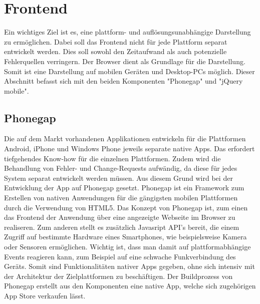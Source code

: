 \documentclass[10pt, conference, compsocconf]{IEEEtran}
\begin{document}
\section{Frontend}
Ein wichtiges Ziel ist es, eine plattform- und aufl\"osungsunabh\"angige Darstellung zu erm\"oglichen. 
Dabei soll das Frontend nicht f\"ur jede Plattform separat entwickelt werden.
Dies soll sowohl den Zeitaufwand als auch potenzielle Fehlerquellen verringern. 
Der Browser dient als Grundlage f\"ur die Darstellung. 
Somit ist eine Darstellung auf mobilen Ger\"aten und Desktop-PCs m\"oglich.
Dieser Abschnitt befasst sich mit den beiden Komponenten "Phonegap" und "jQuery mobile".

\subsection{Phonegap}
Die auf dem Markt vorhandenen Applikationen entwickeln f\"ur die Plattformen Android, iPhone und Windows Phone jeweils se\-parate native Apps. 
Das erfordert tiefgehendes Know-how f\"ur die einzelnen Plattformen. Zudem wird die Behandlung von Fehler- und Change-Requests aufw\"andig, da diese f\"ur jedes System separat entwickelt werden m\"ussen. 
Aus diesem Grund wird bei der Entwicklung der App auf Phonegap gesetzt. Phonegap ist ein Framework zum Erstellen von nativen Anwendungen f\"ur die g\"angigsten mobilen Plattformen durch die Verwendung von HTML5.
Das Konzept von Phonegap ist, zum einen das Frontend der Anwendung \"uber eine angezeigte Webseite im Browser zu realiseren. 
Zum anderen stellt es zus\"atzlich Javasript API's bereit, die einem Zugriff auf bestimmte Hardware eines Smartphones, wie beispielsweise Kamera oder Sensoren erm\"oglichen. \cite[S. 6]{Steyer}
Wichtig ist, dass man damit auf plattformabh\"angige Events reagieren kann, zum Beispiel auf eine schwache Funkverbindung des Ger\"ats. \cite[S. 156]{Steyer}
Somit sind Funktionalit\"aten nativer Apps gegeben, ohne sich intensiv mit der Architektur der Zielplattformen zu besch\"aftigen.
Der Buildprozess von Phonegap erstellt aus den Komponenten eine native App, welche sich zugeh\"origen App Store verkaufen l\"asst. \cite[S. 5]{Steyer}
\end{document}
